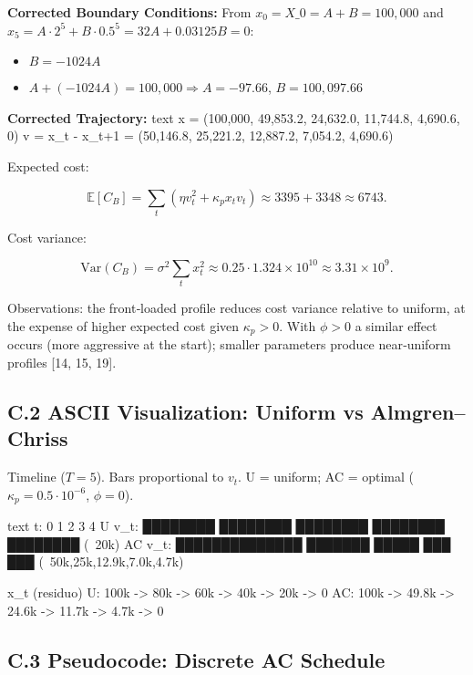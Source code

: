 \documentclass[11pt,a4paper]{article}
\begin{document}
\textbf{Corrected Boundary Conditions:}
From $x_0 = X\_0 = A + B = 100,000$ and $x_5 = A \cdot 2^5 + B \cdot 0.5^5 = 32A + 0.03125B = 0$:
\begin{itemize}
\item $B = -1024A$ 
\item $A + (-1024A) = 100,000 \Rightarrow A = -97.66$, $B = 100,097.66$

\end{itemize}
\textbf{Corrected Trajectory:}
text
x = (100,000, 49,853.2, 24,632.0, 11,744.8, 4,690.6, 0)
v = x_t - x_{t+1} = (50,146.8, 25,221.2, 12,887.2, 7,054.2, 4,690.6)


Expected cost:

\begin{equation}
\mathbb{E}[C_B] = \sum_t (\eta v_t^2 + \kappa_p x_t v_t) \approx 3395 + 3348 \approx 6743.
\end{equation}

Cost variance:

\begin{equation}
\mathrm{Var}(C_B) = \sigma^2\sum_t x_t^2 \approx 0.25\cdot 1.324\times 10^{10} \approx 3.31\times 10^9.
\end{equation}

Observations: the front‑loaded profile reduces cost variance relative to uniform, at the expense of higher expected cost given $\kappa_p>0$. With $\phi>0$ a similar effect occurs (more aggressive at the start); smaller parameters produce near‑uniform profiles [14, 15, 19].

\subsection{C.2 ASCII Visualization: Uniform vs Almgren–Chriss}

Timeline ($T=5$). Bars proportional to $v_t$. U = uniform; AC = optimal ($\kappa_p=0.5\cdot 10^{-6}$, $\phi=0$).

text
t:      0        1        2        3        4
U v_t:  ████████ ████████ ████████ ████████ ████████  (~20k)
AC v\_t: ██████████████ ███████ █████ ███ ███          (~50k,25k,12.9k,7.0k,4.7k)

x\_t (residuo)
U:      100k -> 80k -> 60k -> 40k -> 20k -> 0
AC:     100k -> 49.8k -> 24.6k -> 11.7k -> 4.7k -> 0


\subsection{C.3 Pseudocode: Discrete AC Schedule}
\end{document}
